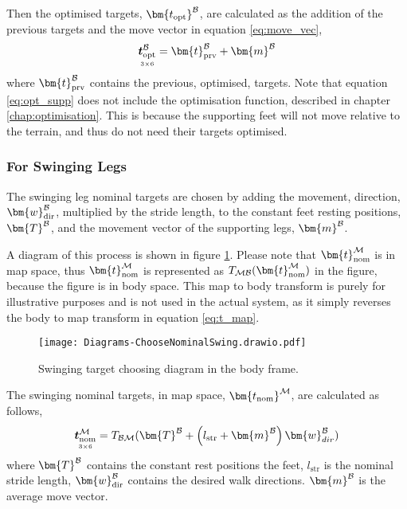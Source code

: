                 Then the optimised targets, \(\bm{t_\text{opt}} ^\fbody\), are calculated as the addition of the previous targets and the move vector in equation \ref{eq:move_vec},
                \begin{equation} \label{eq:opt_supp}
                    \mdim{\boldsymbol{t}_\text{opt}^\fbody}{3}{6} = \bm{t}_\text{prv}^\fbody + \bm{m}^\fbody
                \end{equation}
                where \(\bm{t}_\text{prv}^\fbody\) contains the previous, optimised, targets. Note that equation \ref{eq:opt_supp} does not include the optimisation
                function, described in chapter \ref{chap:optimisation}. This is because the supporting feet will not move relative to the terrain, and thus do not need their targets optimised.
            
            \newpage
            \subsubsection{For Swinging Legs} \label{sec:swing}
                The swinging leg nominal targets are chosen by adding the movement, direction, \(\bm{w}_\text{dir}^\fbody\), multiplied by the stride length, to the constant feet resting positions, \(\bm{T}^\fbody\), and the movement vector of the supporting legs, \(\bm{m} ^\fbody\).
                
                A diagram of this process is shown in figure \ref{fig:swinging_targ}. Please note that \(\bm{t}_\text{nom}^{\fmap}\) is in map space, thus \(\bm{t}_\text{nom}^{\fmap}\) is represented as \(\transframe{\bm{t}_\text{nom}^{\fmap}}{\fmap}{\fbody}\) in the figure, because the figure is in body space. This map to body transform is purely for illustrative purposes and is not used in the actual system, as it simply reverses the body to map transform in equation \ref{eq:t_map}.
                \begin{figure}[h]
                    \centering
                    \texttt{[image: Diagrams-ChooseNominalSwing.drawio.pdf]}
                    \caption{Swinging target choosing diagram in the body frame.} 
                    \label{fig:swinging_targ}
                \end{figure}

                \noindent
                The swinging nominal targets, in map space, \(\bm{t_\text{nom}} ^{\fmap}\), are calculated as follows,
                \begin{equation} \label{eq:t_map}
                    \mdim{\boldsymbol{t}_\text{nom}^{\fmap}}{3}{6} = \transframe{\bm{T}^\fbody + \left(l_\text{str}+\bm{m}^\fbody\right)\bm{w}_{dir}^\fbody}{\fbody}{\fmap}
                \end{equation}
                where \(\bm{T}^\fbody\) contains the constant rest positions the feet, \(l_\text{str}\) is the nominal stride length, \(\bm{w}_\text{dir}^\fbody\) contains the desired walk directions. \(\bm{m}^\fbody\) is the average move vector.

